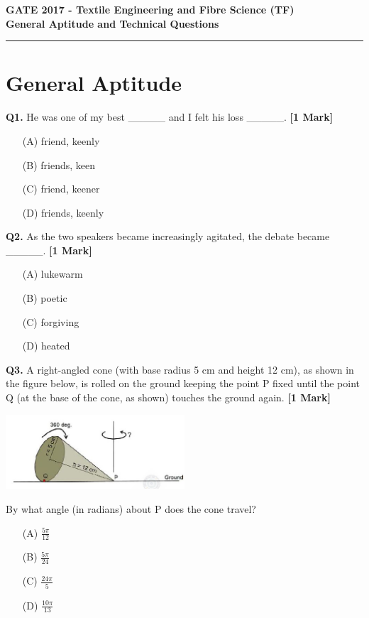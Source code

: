 \documentclass[11pt]{article}
\newcommand{\questiona}[2]{
    \noindent\textbf{Q#2.} #1 \hfill \textbf{[1 Mark]}
}
\begin{document}
\begin{center}
    \Large\textbf{GATE 2017 - Textile Engineering and Fibre Science (TF)} \\
    \large\textbf{General Aptitude and Technical Questions} \\
    \rule{\textwidth}{0.5pt} %
\end{center}

\vspace{0.5cm}

\section*{General Aptitude}

\questiona{He was one of my best \_\_\_\_\_ and I felt his loss \_\_\_\_\_.}{1}
\begin{enumerate}
    \item[(A)] friend, keenly  
    \item[(B)] friends, keen  
    \item[(C)] friend, keener  
    \item[(D)] friends, keenly  
\end{enumerate}
\vspace{0.5cm}

\questiona{As the two speakers became increasingly agitated, the debate became \_\_\_\_\_.}{2}
\begin{enumerate}
    \item[(A)] lukewarm  
    \item[(B)] poetic  
    \item[(C)] forgiving  
    \item[(D)] heated  
\end{enumerate}
\vspace{0.5cm}

\questiona{A right-angled cone (with base radius 5 cm and height 12 cm), as shown in the figure below, is rolled on the ground keeping the point P fixed until the point Q (at the base of the cone, as shown) touches the ground again.}{3}
\begin{center}
\includegraphics[width=0.5\textwidth]{figures/3.png}
\end{center}
By what angle (in radians) about P does the cone travel?
\begin{enumerate}
    \item[(A)] $\frac{5\pi}{12}$
    \item[(B)] $\frac{5\pi}{24}$
    \item[(C)] $\frac{24\pi}{5}$
    \item[(D)] $\frac{10\pi}{13}$
\end{enumerate}
\vspace{0.5cm}
\end{document}
